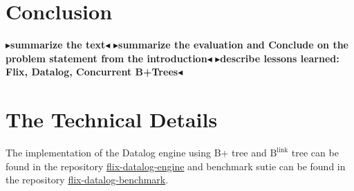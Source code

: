\documentclass[11pt]{report}
\theoremstyle{definition}
\newcommand{\todo}[1]{{\color[rgb]{.5,0,0}\textbf{$\blacktriangleright$#1$\blacktriangleleft$}}}
\begin{document}
\chapter{Conclusion}
\label{ch:conclusion}

\todo{summarize the text}
\todo{summarize the evaluation and Conclude on the problem statement from the introduction}
\todo{describe lessons learned: Flix, Datalog, Concurrent B+Trees}


\cleardoublepage
{}




\cleardoublepage
\appendix
\chapter{The Technical Details}

The implementation of the Datalog engine using B+ tree and $\text{B}^{\text{link}}$ tree can be found in the repository \href{https://github.com/wine99/flix-datalog-engine/tree/blinktree}{flix-datalog-engine} and benchmark sutie can be found in the repository \href{https://github.com/wine99/flix-datalog-benchmark}{flix-datalog-benchmark}.
\end{document}
